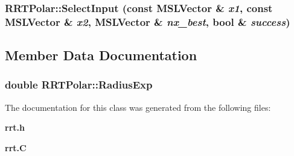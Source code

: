 \subsubsection{ RRTPolar::Select\-Input (const {\bf MSLVector} \& {\em x1}, const {\bf MSLVector} \& {\em x2}, {\bf MSLVector} \& {\em nx\_\-best}, bool \& {\em success})\hspace{0.3cm}{\tt  [protected, virtual]}}\label{classRRTPolar_b1}




\subsection{Member Data Documentation}
\subsubsection{\setlength{\rightskip}{0pt plus 5cm}double RRTPolar::Radius\-Exp}\label{classRRTPolar_m0}




The documentation for this class was generated from the following files:\begin{CompactItemize}
\item 
{\bf rrt.h}\item 
{\bf rrt.C}\end{CompactItemize}
